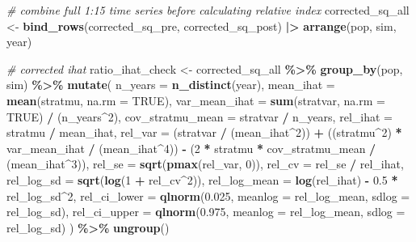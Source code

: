 \documentclass[
]{article}
\newenvironment{Shaded}{\begin{snugshade}}{\end{snugshade}}
\newcommand{\AttributeTok}[1]{\textcolor[rgb]{0.13,0.29,0.53}{#1}}
\newcommand{\CommentTok}[1]{\textcolor[rgb]{0.56,0.35,0.01}{\textit{#1}}}
\newcommand{\ConstantTok}[1]{\textcolor[rgb]{0.56,0.35,0.01}{#1}}
\newcommand{\DecValTok}[1]{\textcolor[rgb]{0.00,0.00,0.81}{#1}}
\newcommand{\FloatTok}[1]{\textcolor[rgb]{0.00,0.00,0.81}{#1}}
\newcommand{\FunctionTok}[1]{\textcolor[rgb]{0.13,0.29,0.53}{\textbf{#1}}}
\newcommand{\NormalTok}[1]{#1}
\newcommand{\OtherTok}[1]{\textcolor[rgb]{0.56,0.35,0.01}{#1}}
\newcommand{\SpecialCharTok}[1]{\textcolor[rgb]{0.81,0.36,0.00}{\textbf{#1}}}
\begin{document}
\begin{Shaded}
\begin{Highlighting}[]
\CommentTok{\# combine full 1:15 time series before calculating relative index}
\NormalTok{corrected\_sq\_all }\OtherTok{\textless{}{-}} \FunctionTok{bind\_rows}\NormalTok{(corrected\_sq\_pre, corrected\_sq\_post) }\SpecialCharTok{|\textgreater{}}
  \FunctionTok{arrange}\NormalTok{(pop, sim, year)}


\CommentTok{\# corrected ihat}
\NormalTok{ratio\_ihat\_check }\OtherTok{\textless{}{-}}\NormalTok{ corrected\_sq\_all }\SpecialCharTok{\%\textgreater{}\%}
  \FunctionTok{group\_by}\NormalTok{(pop, sim) }\SpecialCharTok{\%\textgreater{}\%}
  \FunctionTok{mutate}\NormalTok{(}
    \AttributeTok{n\_years =} \FunctionTok{n\_distinct}\NormalTok{(year),}
    \AttributeTok{mean\_ihat =} \FunctionTok{mean}\NormalTok{(stratmu, }\AttributeTok{na.rm =} \ConstantTok{TRUE}\NormalTok{),}
    \AttributeTok{var\_mean\_ihat =} \FunctionTok{sum}\NormalTok{(stratvar, }\AttributeTok{na.rm =} \ConstantTok{TRUE}\NormalTok{) }\SpecialCharTok{/}\NormalTok{ (n\_years}\SpecialCharTok{\^{}}\DecValTok{2}\NormalTok{),}
    \AttributeTok{cov\_stratmu\_mean =}\NormalTok{ stratvar }\SpecialCharTok{/}\NormalTok{ n\_years,}
    \AttributeTok{rel\_ihat =}\NormalTok{ stratmu }\SpecialCharTok{/}\NormalTok{ mean\_ihat,}
    \AttributeTok{rel\_var =}
\NormalTok{      (stratvar }\SpecialCharTok{/}\NormalTok{ (mean\_ihat}\SpecialCharTok{\^{}}\DecValTok{2}\NormalTok{)) }\SpecialCharTok{+}
\NormalTok{      ((stratmu}\SpecialCharTok{\^{}}\DecValTok{2}\NormalTok{) }\SpecialCharTok{*}\NormalTok{ var\_mean\_ihat }\SpecialCharTok{/}\NormalTok{ (mean\_ihat}\SpecialCharTok{\^{}}\DecValTok{4}\NormalTok{)) }\SpecialCharTok{{-}}
\NormalTok{      (}\DecValTok{2} \SpecialCharTok{*}\NormalTok{ stratmu }\SpecialCharTok{*}\NormalTok{ cov\_stratmu\_mean }\SpecialCharTok{/}\NormalTok{ (mean\_ihat}\SpecialCharTok{\^{}}\DecValTok{3}\NormalTok{)),}
    \AttributeTok{rel\_se =} \FunctionTok{sqrt}\NormalTok{(}\FunctionTok{pmax}\NormalTok{(rel\_var, }\DecValTok{0}\NormalTok{)),}
    \AttributeTok{rel\_cv =}\NormalTok{ rel\_se }\SpecialCharTok{/}\NormalTok{ rel\_ihat,}
    \AttributeTok{rel\_log\_sd =} \FunctionTok{sqrt}\NormalTok{(}\FunctionTok{log}\NormalTok{(}\DecValTok{1} \SpecialCharTok{+}\NormalTok{ rel\_cv}\SpecialCharTok{\^{}}\DecValTok{2}\NormalTok{)),}
    \AttributeTok{rel\_log\_mean =} \FunctionTok{log}\NormalTok{(rel\_ihat) }\SpecialCharTok{{-}} \FloatTok{0.5} \SpecialCharTok{*}\NormalTok{ rel\_log\_sd}\SpecialCharTok{\^{}}\DecValTok{2}\NormalTok{,}
    \AttributeTok{rel\_ci\_lower =} \FunctionTok{qlnorm}\NormalTok{(}\FloatTok{0.025}\NormalTok{, }\AttributeTok{meanlog =}\NormalTok{ rel\_log\_mean, }\AttributeTok{sdlog =}\NormalTok{ rel\_log\_sd),}
    \AttributeTok{rel\_ci\_upper =} \FunctionTok{qlnorm}\NormalTok{(}\FloatTok{0.975}\NormalTok{, }\AttributeTok{meanlog =}\NormalTok{ rel\_log\_mean, }\AttributeTok{sdlog =}\NormalTok{ rel\_log\_sd)}
\NormalTok{  ) }\SpecialCharTok{\%\textgreater{}\%}
  \FunctionTok{ungroup}\NormalTok{()}
\end{Highlighting}
\end{Shaded}
\end{document}
